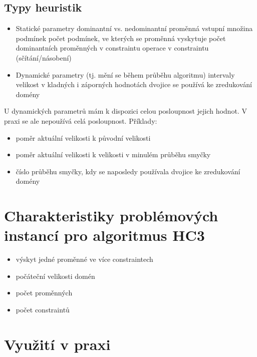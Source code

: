 \subsection{Typy heuristik}

\begin{itemize}
  \item Statické parametry
    \subitem dominantní vs. nedominantní proměnná
    \subitem vstupní množina podmínek
        \subsubitem počet podmínek, ve kterých se proměnná vyskytuje
        \subsubitem počet dominantních proměnných v constraintu
        \subsubitem operace v constraintu (sčítání/násobení)
  \item Dynamické parametry (tj. mění se během průběhu algoritmu)
    \subitem intervaly
        \subsubitem velikost
        \subsubitem v kladných i záporných hodnotách
    \subitem dvojice se používá ke zredukování domény
\end{itemize}

U dynamických parametrů mám k dispozici celou posloupnost jejich hodnot. V praxi se ale nepoužívá celá posloupnost. Příklady:

\begin{itemize}
  \item poměr aktuální velikosti k původní velikosti
  \item poměr aktuální velikosti k velikosti v minulém průběhu smyčky
  \item číslo průběhu smyčky, kdy se naposledy používala dvojice ke zredukování domény
\end{itemize}


\section{Charakteristiky problémových instancí pro algoritmus HC3}
\begin{itemize}
  \item výskyt jedné proměnné ve více constraintech
  \item počáteční velikosti domén
  \item počet proměnných
  \item počet constraintů
\end{itemize}


\section{Využití v praxi}